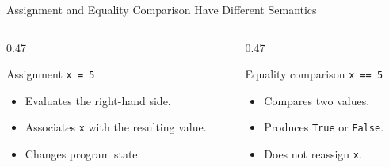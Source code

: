 \documentclass[aspectratio=169,10pt]{beamer}
\begin{document}
\begin{frame}{Assignment and Equality Comparison Have Different Semantics}
  \begin{columns}[T,onlytextwidth]
    \begin{column}{0.47\textwidth}
      \begin{block}{Assignment}
        \centering
        \Large\texttt{x = 5}
      \end{block}

      \begin{itemize}
        \item Evaluates the right-hand side.
        \item Associates \texttt{x} with the resulting value.
        \item Changes program state.
      \end{itemize}
    \end{column}

    \begin{column}{0.47\textwidth}
      \begin{block}{Equality comparison}
        \centering
        \Large\texttt{x == 5}
      \end{block}

      \begin{itemize}
        \item Compares two values.
        \item Produces \texttt{True} or \texttt{False}.
        \item Does not reassign \texttt{x}.
      \end{itemize}
    \end{column}
  \end{columns}
\end{frame}

\end{document}
